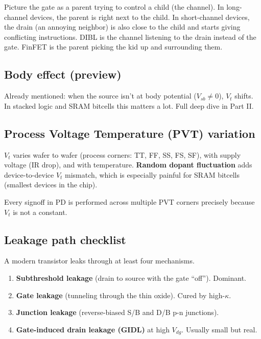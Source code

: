 \documentclass[11pt]{article}
\begin{document}
\begin{hook}
Picture the gate as a parent trying to control a child (the channel). In long-channel devices, the parent is right next to the child. In short-channel devices, the drain (an annoying neighbor) is also close to the child and starts giving conflicting instructions. DIBL is the channel listening to the drain instead of the gate. FinFET is the parent picking the kid up and surrounding them.
\end{hook}

\subsection{Body effect (preview)}

Already mentioned: when the source isn't at body potential ($V_{sb} \neq 0$), $V_t$ shifts. In stacked logic and SRAM bitcells this matters a lot. Full deep dive in Part II.

\subsection{Process Voltage Temperature (PVT) variation}

$V_t$ varies wafer to wafer (process corners: TT, FF, SS, FS, SF), with supply voltage (IR drop), and with temperature. \textbf{Random dopant fluctuation} adds device-to-device $V_t$ mismatch, which is especially painful for SRAM bitcells (smallest devices in the chip).

Every signoff in PD is performed across multiple PVT corners precisely because $V_t$ is not a constant.

\subsection{Leakage path checklist}

A modern transistor leaks through at least four mechanisms.
\begin{enumerate}
\item \textbf{Subthreshold leakage} (drain to source with the gate ``off''). Dominant.
\item \textbf{Gate leakage} (tunneling through the thin oxide). Cured by high-$\kappa$.
\item \textbf{Junction leakage} (reverse-biased S/B and D/B p-n junctions).
\item \textbf{Gate-induced drain leakage (GIDL)} at high $V_{dg}$. Usually small but real.
\end{enumerate}
\end{document}
